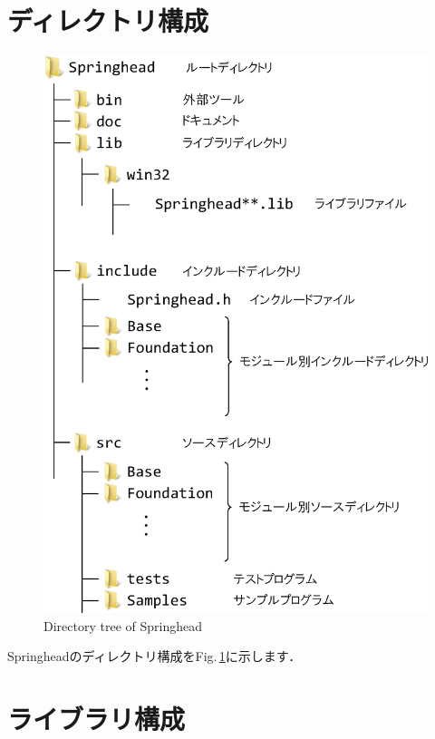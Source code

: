 \section{\KLUDGE ディレクトリ構成}

\begin{figure}[t]
\begin{center}
\includegraphics[width=.6\hsize]{fig/filetree.eps}
\end{center}
\caption{Directory tree of Springhead}
\label{fig_filetree}
\end{figure}

Springhead\KLUDGE のディレクトリ構成をFig.\,\ref{fig_filetree}\KLUDGE に示します．

\section{\KLUDGE ライブラリ構成}

